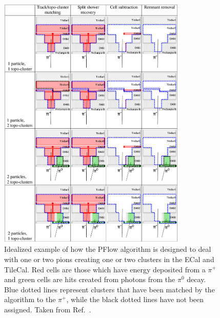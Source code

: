 \begin{figure}[htbp]
    \centering
    \includegraphics[width=0.8\textwidth]{figures/reco/reco_jets_pflow.png}
    \caption{Idealized example of how the PFlow algorithm is designed to deal with one or two pions creating one or two clusters in the ECal and TileCal. Red cells are those which have energy deposited from a $\pi^{+}$ and green cells are hits created from photons from the $\pi^{0}$ decay. Blue dotted lines represent clusters that have been matched by the algorithm to the $\pi^{+}$, while the black dotted lines have not been assigned. Taken from Ref.~\cite{ATLAS:2013eua}. }\label{fig:reco_pflow}
\end{figure}